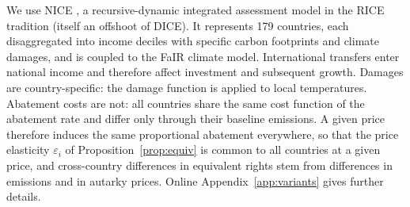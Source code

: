 \documentclass[12pt,english]{article}
\theoremstyle{remark}
\begin{document}
We use NICE \citep{young-brun_within-country_2025}, a recursive-dynamic integrated assessment model in the RICE tradition (itself an offshoot of DICE). It represents 179 countries, each disaggregated into income deciles with specific carbon footprints and climate damages, and is coupled to the FaIR climate model. 
International transfers enter national income and therefore affect investment and subsequent growth. %
Damages are country-specific: the damage function is applied to local temperatures. 
Abatement costs are not: all countries share the same cost function of the abatement rate %
and differ only through their baseline emissions. %
A given price therefore induces the same proportional abatement everywhere, so that the price elasticity $\varepsilon_i$ of Proposition~\ref{prop:equiv} is common to all countries at a given price, and cross-country differences in equivalent rights stem from differences in emissions and in autarky prices. Online Appendix~\ref{app:variants} gives further details.%
\end{document}
